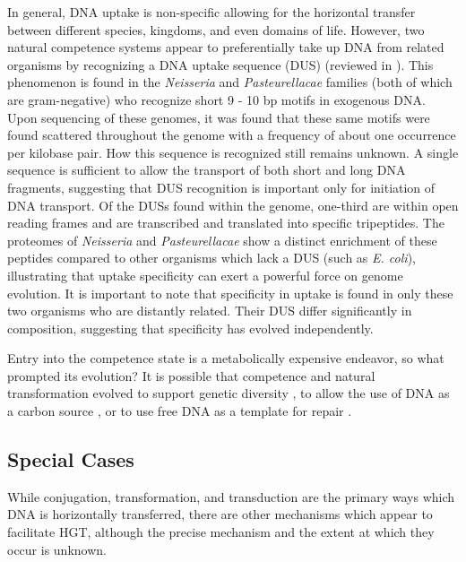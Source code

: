 In general, DNA uptake is non-specific allowing for the horizontal transfer
between different species, kingdoms, and even domains of life. However, two natural competence systems
appear to preferentially take up DNA from related organisms by recognizing a DNA
uptake sequence (DUS) (reviewed in \citet{Mell:2014dj}). This phenomenon is
found in the \textit{Neisseria} and \textit{Pasteurellacae} families (both of
which are gram-negative) who recognize short 9 - 10 bp motifs in exogenous DNA.
Upon sequencing of these genomes, it was found that these same motifs were found
scattered throughout the genome with a frequency of about one occurrence per
kilobase pair.  How this sequence is recognized still remains unknown. A single
sequence is sufficient to allow the transport of both short and long DNA
fragments, suggesting that DUS recognition is important only for initiation of
DNA transport. Of the DUSs found within the genome, one-third are within open
reading frames and are transcribed and translated into specific tripeptides. The
proteomes of \textit{Neisseria} and \textit{Pasteurellacae} show a distinct
enrichment of these peptides compared to other organisms which lack a DUS (such
as \textit{E. coli}), illustrating that uptake specificity can exert a powerful
force on genome evolution.  It is important to note that specificity in uptake
is found in only these two organisms who are distantly related. Their DUS differ significantly in
composition, suggesting that specificity has evolved independently.


Entry into the competence state is a metabolically expensive endeavor, so what
prompted its evolution? It is possible that competence and
natural transformation evolved to support genetic diversity \cite{Barton:1998uq,
Otto:2006vm}, to allow the use of DNA as a carbon source \cite{Dubnau:1999vq,
Redfield:2001vx}, or to use free DNA as a template for repair
\cite{Claverys:2006do, Dorer:2010tf}. 


\subsection*{Special Cases}
While conjugation, transformation, and transduction are the primary ways which
DNA is horizontally transferred, there are other mechanisms which appear to
facilitate HGT, although the precise mechanism and the extent at which they
occur is unknown.

